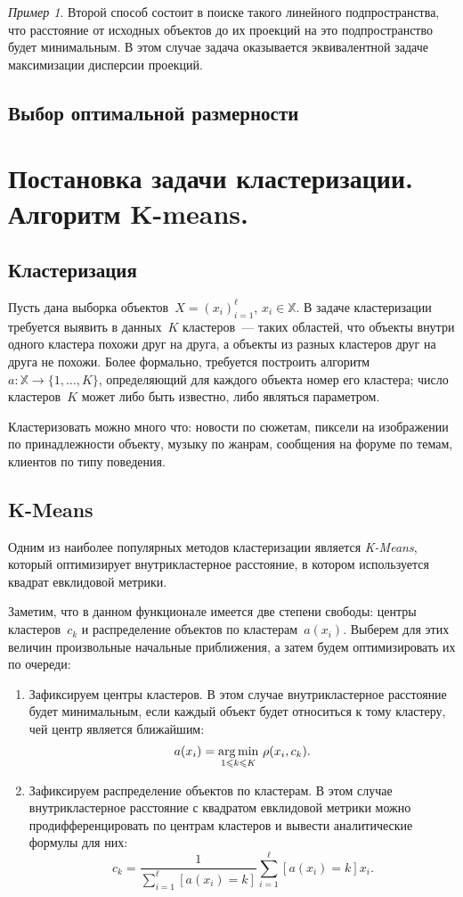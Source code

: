 \documentclass[a4paper, 12pt]{article}
\newcommand{\argmin}{\mathop{\rm arg\,min}\limits}
\renewcommand{\leq}{\leqslant}
\def\XX{\mathbb{X}}
\theoremstyle{plain} %
\theoremstyle{definition} %
\theoremstyle{remark} %
\newtheorem{example}{Пример}
\begin{document}
\begin{example}
Второй способ состоит в поиске такого линейного подпространства,
что расстояние от исходных объектов до их проекций на это подпространство
будет минимальным.
В этом случае задача оказывается эквивалентной задаче максимизации дисперсии проекций.

\subsection{Выбор оптимальной размерности}

\section{Постановка задачи кластеризации. Алгоритм K-means.}

\subsection{Кластеризация}

Пусть дана выборка объектов~$X = (x_i)_{i = 1}^{\ell}$, $x_i \in \XX$.
В задаче кластеризации требуется выявить в данных~$K$ кластеров~---
таких областей, что объекты внутри одного кластера похожи друг на друга,
а объекты из разных кластеров друг на друга не похожи.
Более формально, требуется построить алгоритм~$a: \XX \to \{1, \dots, K\}$,
определяющий для каждого объекта номер его кластера;
число кластеров~$K$ может либо быть известно, либо являться параметром.

Кластеризовать можно много что: новости по сюжетам, пиксели на изображении по принадлежности объекту,
музыку по жанрам, сообщения на форуме по темам, клиентов по типу поведения.

\subsection{K-Means}
Одним из наиболее популярных методов кластеризации является \emph{K-Means},
который оптимизирует внутрикластерное расстояние,
в котором используется квадрат евклидовой метрики.

Заметим, что в данном функционале имеется две степени свободы:
центры кластеров~$c_k$ и распределение объектов по кластерам~$a(x_i)$.
Выберем для этих величин произвольные начальные приближения,
а затем будем оптимизировать их по очереди:
\begin{enumerate}
    \item Зафиксируем центры кластеров.
        В этом случае внутрикластерное расстояние будет минимальным,
        если каждый объект будет относиться к тому кластеру, чей центр является ближайшим:
        \[
            a(x_i)
            =
            \underset{1 \leq k \leq K}{\argmin}~
                \rho(x_i, c_k).
        \]
    \item Зафиксируем распределение объектов по кластерам.
        В этом случае внутрикластерное расстояние с квадратом евклидовой метрики можно продифференцировать
        по центрам кластеров и вывести аналитические формулы для них:
        \[
            c_k
            =
            \frac{1}{\sum_{i = 1}^{\ell} [a(x_i) = k]}
            \sum_{i = 1}^{\ell}
                [a(x_i) = k] x_i.
        \]
\end{enumerate}


\end{example}
\end{document}
